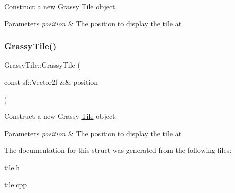 Construct a new Grassy \mbox{\hyperlink{classTile}{Tile}} object. 


\begin{DoxyParams}{Parameters}
{\em position} & The position to display the tile at \\
\hline
\end{DoxyParams}
\mbox{\label{structGrassyTile_acd1aa8c780a09b87e0bb4b39a435c536}} 
\subsubsection{\texorpdfstring{GrassyTile()}{GrassyTile()}\hspace{0.1cm}{\footnotesize\ttfamily [2/2]}}
{\footnotesize\ttfamily Grassy\+Tile\+::\+Grassy\+Tile (\begin{DoxyParamCaption}\item[{const sf\+::\+Vector2f \&\&}]{position }\end{DoxyParamCaption})\hspace{0.3cm}{\ttfamily [explicit]}}



Construct a new Grassy \mbox{\hyperlink{classTile}{Tile}} object. 


\begin{DoxyParams}{Parameters}
{\em position} & The position to display the tile at \\
\hline
\end{DoxyParams}


The documentation for this struct was generated from the following files\+:\begin{DoxyCompactItemize}
\item 
tile.\+h\item 
tile.\+cpp\end{DoxyCompactItemize}

